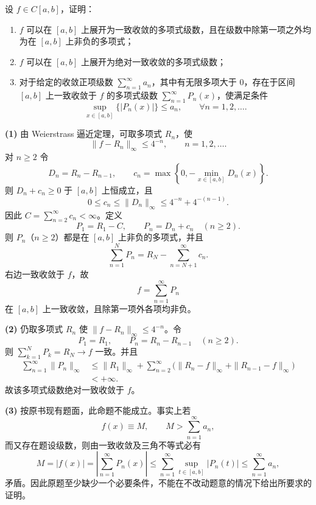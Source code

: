\begin{xexercise}[2]
设 $f\in C[a,b]$，证明：
\begin{enumerate}[label=(\arabic*)]
\item $f$ 可以在 $[a,b]$ 上展开为一致收敛的多项式级数，且在级数中除第一项之外均为在 $[a,b]$ 上非负的多项式；
\item $f$ 可以在 $[a,b]$ 上展开为绝对一致收敛的多项式级数；
\item 对于给定的收敛正项级数 $\sum_{n=1}^{\infty}a_n$，其中有无限多项大于 0，存在于区间 $[a,b]$ 上一致收敛于 $f$ 的多项式级数 $\sum_{n=1}^{\infty}P_n(x)$，使满足条件
\[
  \sup_{x\in[a,b]}\{|P_n(x)|\}\leqslant a_n,
  \qquad \forall n=1,2,\ldots.
\]
\end{enumerate}
\end{xexercise}
\begin{xsolution}
\textbf{(1)}\quad
由 Weierstrass 逼近定理，可取多项式 $R_n$，使
\[
  \|f-R_n\|_\infty\leqslant4^{-n},\qquad n=1,2,\ldots.
\]
对 $n\geqslant2$ 令
\[
  D_n=R_n-R_{n-1},\qquad
  c_n=\max\left\{0,-\min_{x\in[a,b]}D_n(x)\right\}.
\]
则 $D_n+c_n\geqslant0$ 于 $[a,b]$ 上恒成立，且
\[
  0\leqslant c_n\leqslant\|D_n\|_\infty
  \leqslant4^{-n}+4^{-(n-1)}.
\]
因此 $C=\sum_{n=2}^{\infty}c_n<\infty$。定义
\[
  P_1=R_1-C,
  \qquad P_n=D_n+c_n\quad(n\geqslant2).
\]
则 $P_n$（$n\geqslant2$）都是在 $[a,b]$ 上非负的多项式，并且
\[
  \sum_{n=1}^NP_n
  =R_N-\sum_{n=N+1}^{\infty}c_n.
\]
右边一致收敛于 $f$，故
\[
  f=\sum_{n=1}^{\infty}P_n
\]
在 $[a,b]$ 上一致收敛，且除第一项外各项均非负。

\textbf{(2)}\quad
仍取多项式 $R_n$ 使 $\|f-R_n\|_\infty\leqslant4^{-n}$。令
\[
  P_1=R_1,
  \qquad P_n=R_n-R_{n-1}\quad(n\geqslant2).
\]
则 $\sum_{k=1}^NP_k=R_N\to f$ 一致。并且
\[
\begin{aligned}
  \sum_{n=1}^{\infty}\|P_n\|_\infty
  &\leqslant\|R_1\|_\infty
  +\sum_{n=2}^{\infty}
  \bigl(\|R_n-f\|_\infty+\|R_{n-1}-f\|_\infty\bigr)\\
  &<+\infty.
\end{aligned}
\]
故该多项式级数绝对一致收敛于 $f$。

\textbf{(3)}\quad
按原书现有题面，此命题不能成立。事实上若
\[
  f(x)\equiv M,\qquad
  M>\sum_{n=1}^{\infty}a_n,
\]
而又存在题设级数，则由一致收敛及三角不等式必有
\[
  M=|f(x)|
  =\left|\sum_{n=1}^{\infty}P_n(x)\right|
  \leqslant\sum_{n=1}^{\infty}\sup_{t\in[a,b]}|P_n(t)|
  \leqslant\sum_{n=1}^{\infty}a_n,
\]
矛盾。因此原题至少缺少一个必要条件，不能在不改动题意的情况下给出所要求的证明。
\end{xsolution}


